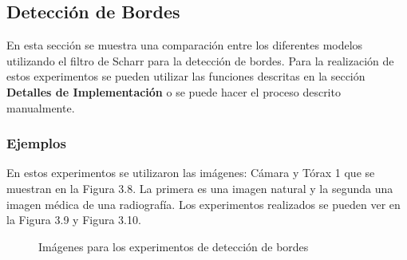 \subsection{Detecci\'on de Bordes}

En esta secci\'on se muestra una comparaci\'on entre los diferentes modelos utilizando el filtro de Scharr para la detecci\'on de bordes. Para la realizaci\'on de estos experimentos se pueden utilizar las funciones descritas en la secci\'on \textbf{Detalles de Implementaci\'on} o se puede hacer el proceso descrito manualmente. 

\subsubsection{Ejemplos}

En estos experimentos se utilizaron las im\'agenes: C\'amara y T\'orax 1 que se muestran en la Figura 3.8. La primera es una imagen natural y la segunda una imagen m\'edica de una radiograf\'ia. Los experimentos realizados se pueden ver en la Figura 3.9 y Figura 3.10.

\begin{figure}[h]
	\begin{center}
		\caption{Im\'agenes para los experimentos de detecci\'on de bordes}
	\end{center}
\end{figure}

